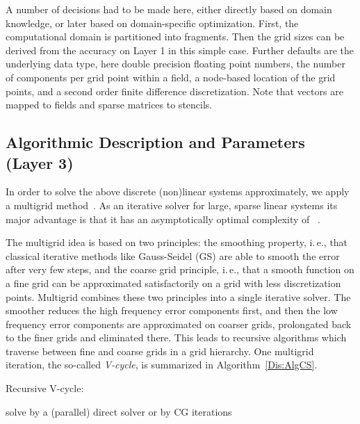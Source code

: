 \documentclass[onecolumn]{svjour3}
\newlength{\algrhswidth}
\newcommand{\algrhs}[1]{\hfill \parbox[t]{\algrhswidth}{#1}}
\begin{document}
A number of decisions had to be made here, either directly based on domain knowledge, or later based on domain-specific optimization. First, the computational domain is partitioned into fragments.   
Then the grid sizes can be derived from the accuracy on Layer 1 in this simple case. Further defaults are the underlying data type, here double precision floating point numbers, the number of components per grid point within a field, a node-based location of the grid points, and a second order finite difference discretization. Note that vectors are mapped to fields and sparse matrices to stencils.

\subsection{Algorithmic Description and Parameters (Layer 3)}
\label{sec:MG}

In order to solve the above discrete (non)linear systems approximately, we apply a multigrid method~\cite{Brandt77,Hackbusch85}.
As an iterative solver for large, sparse linear systems its major advantage 
is that it has an asymptotically optimal complexity of ~\cite{Briggshenson00,Trottenbergoosterlee01,Griebel99}.

The multigrid idea is based on two principles:
the smoothing property, i.\,e., that classical iterative methods like Gauss-Seidel (GS) are able 
to smooth the error after very few steps, and the coarse grid principle, 
i.\,e., that a smooth function on a fine grid can be approximated satisfactorily on a grid with 
less discretization points.
Multigrid combines these two principles into a single iterative solver.
The smoother reduces the high frequency error components first, and then the low
frequency error components are approximated on coarser grids, prolongated
back to the finer grids and eliminated there.
This leads to recursive algorithms which traverse between fine and coarse grids in a grid
hierarchy. 
One multigrid iteration, the so-called \textit{V-cycle}, is summarized in 
Algorithm~\ref{Dis:AlgCS}. 

\begin{algorithm}
\caption[Multigrid correction scheme]{Recursive V-cycle: }
\begin{algorithmic}[1]
 \STATE solve  by a (parallel) direct solver or by CG iterations

\ELSE

\STATE 
\algrhs{}

\STATE 
\algrhs{}
\STATE 
\algrhs{}

\STATE 
\algrhs{}

\STATE 
\algrhs{}

\STATE  \algrhs{}
\ENDIF
\end{algorithmic} \label{Dis:AlgCS}

\end{algorithm}
\end{document}
